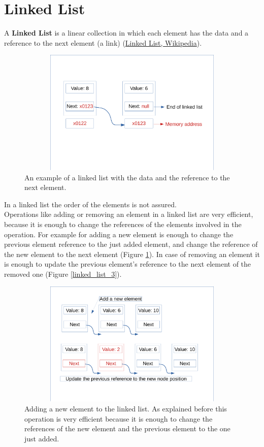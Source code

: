 \newpage
\section{Linked List}
A \textbf{Linked List} is a linear collection in which each element has the data and a reference to the next element (a link) \cite{wikilinkedlist} (\href{https://en.wikipedia.org/wiki/Linked_list}{Linked List, Wikipedia}). 
\begin{figure}[hb]
	\includegraphics[width=14cm,height=6cm]{chapters/datastructures/images/linked_list_1.pdf}
	\caption[]{An example of a linked list with the data and the reference to the next element.}
\end{figure}
In a linked list the order of the elements is not assured. 
\\
Operations like adding or removing an element in a linked list are very efficient, because it is enough to change the references of the elements involved in the operation. For example for adding a new element is enough to change the previous element reference to the just added element, and change the reference of the new element to the next element (Figure \ref{linked_list_2}). In case of removing an element it is enough to update the previous element's reference to the next element of the removed one (Figure \ref{linked_list_3}). 
\begin{figure}[h]
	\includegraphics[width=14cm,height=6cm]{chapters/datastructures/images/linked_list_2_1.pdf}
	\caption[]{Adding a new element to the linked list. As explained before this operation is very efficient because it is enough to change the references of the new element and the previous element to the one just added.}
	\label{linked_list_2}
\end{figure}
